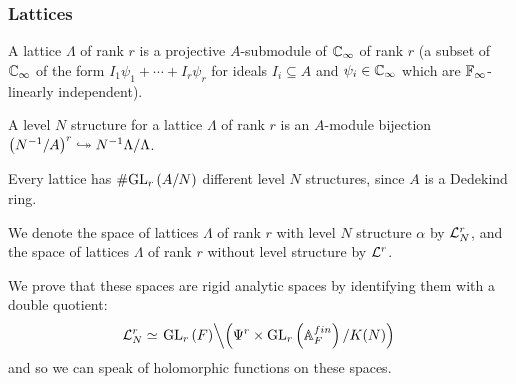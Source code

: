 \begin{frame} \frametitle{Lattices}
  \begin{definition}
    A lattice $\Lambda$ of rank $r$ is a projective $A$-submodule of $\CC_\infty$ of rank $r$ \pause (\ie a subset of $\CC_\infty$ of the form $I_1\psi_1 +\dotsb +I_r\psi_r$ for ideals $I_i \subseteq A$ and $\psi_i \in \CC_\infty$ which are $\FF_\infty$-linearly independent). \pause

    A level $N$ structure for a lattice $\Lambda$ of rank $r$ is an $A$-module bijection $\parens{N^{-1}/A}^r \ionto N^{-1}\Lambda/\Lambda$.
  \end{definition} \pause

  Every lattice has $\size{\GL[r]{A/N}}$ different level $N$ structures, since $A$ is a Dedekind ring.

  We denote the space of lattices $\Lambda$ of rank $r$ with level $N$ structure $\alpha$ by $\LL_N^r$, and the space of lattices $\Lambda$ of rank $r$ without level structure by $\LL^r$. \pause

  We prove that these spaces are rigid analytic spaces by identifying them with a double quotient:
  \[ \LL_N^r \simeq \left. \GL[r]{F} \middle\backslash \parens{\Psi^r \times \GL[r]{\AA_F^{fin}}/K(N)} \right. \]
  and so we can speak of holomorphic functions on these spaces.
\end{frame}


